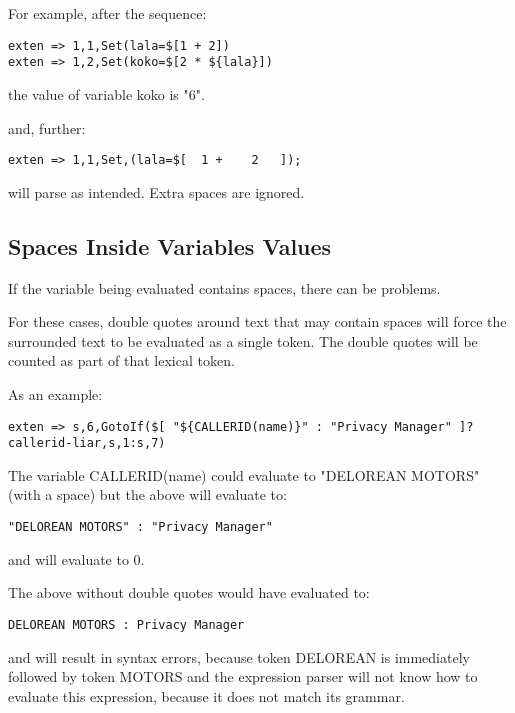 For example, after the sequence:
\begin{astlisting}
\begin{verbatim}
exten => 1,1,Set(lala=$[1 + 2])
exten => 1,2,Set(koko=$[2 * ${lala}])
\end{verbatim}
\end{astlisting}
the value of variable koko is "6".

and, further:
\begin{astlisting}
\begin{verbatim}
exten => 1,1,Set,(lala=$[  1 +    2   ]);
\end{verbatim}
\end{astlisting}
will parse as intended. Extra spaces are ignored.


\subsection{Spaces Inside Variables Values}

If the variable being evaluated contains spaces, there can be problems.

For these cases, double quotes around text that may contain spaces
will force the surrounded text to be evaluated as a single token.
The double quotes will be counted as part of that lexical token.

As an example:

\begin{astlisting}
\begin{verbatim}
exten => s,6,GotoIf($[ "${CALLERID(name)}" : "Privacy Manager" ]?callerid-liar,s,1:s,7)
\end{verbatim}
\end{astlisting}

The variable CALLERID(name) could evaluate to "DELOREAN MOTORS" (with a space)
but the above will evaluate to:

\begin{verbatim}
"DELOREAN MOTORS" : "Privacy Manager"
\end{verbatim}

and will evaluate to 0.

The above without double quotes would have evaluated to:

\begin{verbatim}
DELOREAN MOTORS : Privacy Manager
\end{verbatim}

and will result in syntax errors, because token DELOREAN is immediately
followed by token MOTORS and the expression parser will not know how to
evaluate this expression, because it does not match its grammar.


